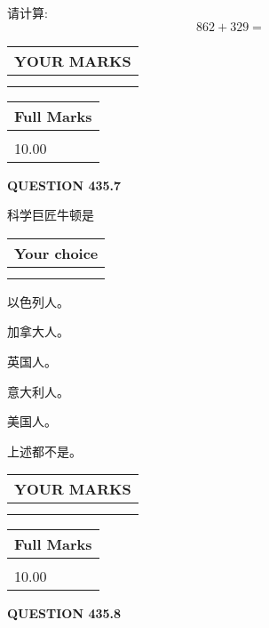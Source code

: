 \documentclass{ctexart}
\begin{document}
  
 
请计算:
\begin{equation}
862 +  %
329 = \nonumber
\end{equation}
 

 

 
  
\vspace{0.2in}
  
\noindent\begin{tabular}{|l|}
\hline
 YOUR MARKS  \\
\hline
 \\ 
 \\ 
\hline
\end{tabular}
\hspace{0.05in} \begin{tabular}{|l|}
\hline
 Full Marks  \\
\hline
 \\ 
10.00 \\
\hline
\end{tabular}
{\textbf{\Large{QUESTION
435.7 
}}}
  
  
科学巨匠牛顿是
  
  
\noindent\hspace{3.0in} \begin{tabular}{|l|}
\hline
Your choice \\
\hline
 \\ 
 \\ 
\hline
\end{tabular}
  
  
 
 
以色列人。
 
 
加拿大人。
 
 
英国人。
 
 
意大利人。
 
 
美国人。
 
 
 上述都不是。
 
 
  
\vspace{0.2in}
  
\noindent\begin{tabular}{|l|}
\hline
 YOUR MARKS  \\
\hline
 \\ 
 \\ 
\hline
\end{tabular}
\hspace{0.05in} \begin{tabular}{|l|}
\hline
 Full Marks  \\
\hline
 \\ 
10.00 \\
\hline
\end{tabular}
{\textbf{\Large{QUESTION
435.8 
}}}
  
\end{document}
